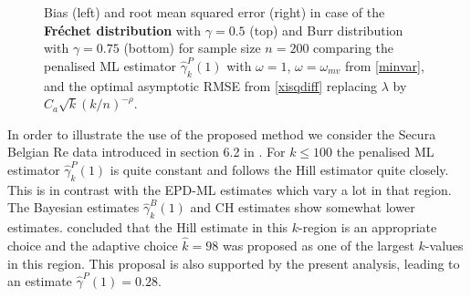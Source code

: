 \begin{figure}[h]
\begin{subfigure}[h]{0.40\linewidth}
		\end{subfigure}
		\caption{Bias (left) and root mean squared error (right) in case of the \textbf{Fr\'echet distribution} with $\gamma=0.5$ (top) and Burr distribution with $\gamma=0.75$ (bottom) for sample size $n=200$ comparing  the penalised ML estimator $\hat{\gamma}^P_{k}(1)$ with $\omega=1$, $\omega = \omega_{mv}$ from \eqref{minvar}, and the optimal asymptotic RMSE from \eqref{xisqdiff} replacing $\lambda$ by $C_a\sqrt{k}(k/n)^{-\rho}$.}
		\label{paper1:fig5}
	\end{figure}

In order to illustrate the use of the proposed method we consider the Secura Belgian Re data introduced in section 6.2 in \cite{sts626}.  For $k \leq 100$ the penalised ML estimator $\hat{\gamma}^P_{k}(1)$ is quite constant and follows the Hill estimator quite closely. This is in contrast with the EPD-ML estimates which vary a lot in that region. The Bayesian estimates $\hat{\gamma}^B_{k}(1)$ and CH estimates show somewhat lower estimates. \cite{sts626} concluded that the Hill estimate in this $k$-region is an appropriate choice and the adaptive choice $\hat{k}=98$ was proposed as one of the largest $k$-values in this region. This proposal is also supported by the present analysis, leading to an estimate $\hat{\gamma}^P(1)=0.28$. 
